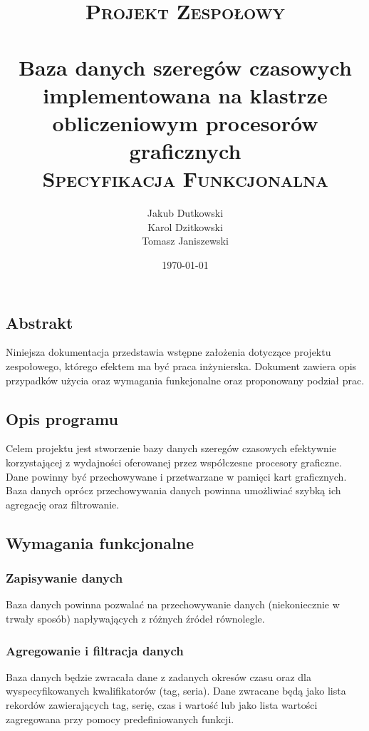 \documentclass[paper=a4, fontsize=11pt]{scrartcl} %
\title{
\vspace*{\fill}
\normalfont
\textsc{Projekt Zespołowy}\\ [20pt]
\horrule{1.5pt} \\[0.4cm] %
\LARGE Baza danych szeregów czasowych implementowana na klastrze obliczeniowym procesorów graficznych
\horrule{1.5pt} \\[0.1cm] %
\normalsize
\textsc{Specyfikacja Funkcjonalna} \\ [20pt]
\vspace*{\fill}
}
\author{Jakub Dutkowski \\ Karol Dzitkowski \\ Tomasz Janiszewski } %
\date{\normalsize\today} %
\numberwithin{equation}{section} %
\numberwithin{figure}{section} %
\numberwithin{table}{section} %
\begin{document}
\maketitle

\thispagestyle{empty}
\clearpage

\tableofcontents
\listoffigures

\chapter{}

\clearpage

\vspace{4em}


\section{Abstrakt}
Niniejsza dokumentacja przedstawia wstępne założenia dotyczące projektu zespołowego, którego efektem ma być praca inżynierska.
Dokument zawiera opis przypadków użycia oraz wymagania funkcjonalne oraz proponowany podział prac.

\section{Opis programu}
Celem projektu jest stworzenie bazy danych szeregów czasowych efektywnie korzystającej z wydajności oferowanej przez współczesne
procesory graficzne. Dane powinny być przechowywane i przetwarzane w pamięci kart graficznych. Baza danych oprócz przechowywania
danych powinna umożliwiać szybką ich agregację oraz filtrowanie.

\section{Wymagania funkcjonalne}
    \subsection{Zapisywanie danych}
    Baza danych powinna pozwalać na przechowywanie danych (niekoniecznie w trwały sposób) napływających z różnych źródeł
    równolegle.
    \subsection{Agregowanie i filtracja danych}
    Baza danych będzie zwracała dane z zadanych okresów czasu oraz dla wyspecyfikowanych kwalifikatorów (tag, seria).
    Dane zwracane będą jako lista rekordów zawierających tag, serię, czas i wartość lub jako lista wartości zagregowana
    przy pomocy predefiniowanych funkcji.
\end{document}

